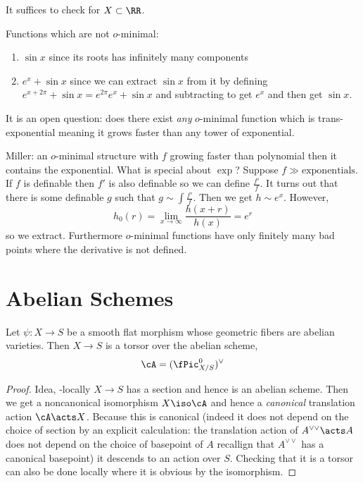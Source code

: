 \documentclass[12pt]{article}
\begin{document}
\begin{theorem}
It suffices to check for $X \subset \RR$.
\end{theorem}

\begin{example}
Functions which are not $o$-minimal:
\begin{enumerate}
\item $\sin{x}$ since its roots has infinitely many components
\item $e^x + \sin{x}$ since we can extract $\sin{x}$ from it by defining $e^{x + 2 \pi} + \sin{x} = e^{2 \pi} e^x + \sin{x}$ and subtracting to get $e^x$ and then get $\sin{x}$.
\end{enumerate}
\end{example}

It is an open question: does there exist \textit{any} $o$-minimal function which is trans-exponential meaning it grows faster than any tower of exponential. 

Miller: an $o$-minimal structure with $f$ growing faster than polynomial then it contains the exponential. What is special about $\exp$? Suppose $f \gg \text{exponentials}$. If $f$ is definable then $f'$ is also definable so we can define $\frac{f'}{f}$. It turns out that there is some definable $g$ such that $g \sim \int \frac{f'}{f}$. Then we get $h \sim e^x$. However,
\[ h_0(r) = \lim_{x \to \infty} \frac{h(x+r)}{h(x)} = e^r \]
so we extract. Furthermore $o$-minimal functions have only finitely many bad points where the derivative is not defined.

\section{Abelian Schemes}

\begin{lemma}
Let $\psi : X \to S$ be a smooth flat morphism whose geometric fibers are abelian varieties. Then $X \to S$ is a torsor over the abelian scheme,
\[ \cA = (\fPic_{X/S}^0)^\vee \]
\end{lemma}

\begin{proof}
Idea, \etale-locally $X \to S$ has a section and hence is an abelian scheme. Then we get a noncanonical isomorphism $X \iso \cA$ and hence a \textit{canonical} translation action $\cA \acts X$. Because this is canonical (indeed it does not depend on the choice of section by an explicit calculation: the translation action of $A^{\vee \vee} \acts A$ does not depend on the choice of basepoint of $A$ recallign that $A^{\vee \vee}$ has a canonical basepoint) it descends to an action over $S$. Checking that it is a torsor can also be done \etale locally where it is obvious by the isomorphism.
\end{proof}
\end{document}
